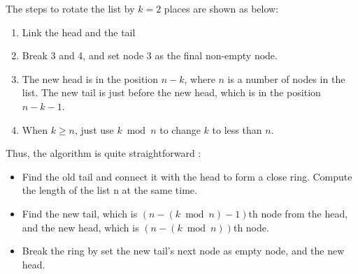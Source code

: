 The steps to rotate the list by $k=2$ places are shown as below:

\begin{enumerate}
\item Link the head and the tail
\begin{figure}[H]
\end{figure}
\item Break 3 and 4, and set node 3 as the final non-empty node.
\begin{figure}[H]
\end{figure}
\item The new head is in the position $n-k$, where $n$ is a number of nodes in the list. The new tail is just before the new head, which is in the position $n - k - 1$.
\item When $k\geq n$, just use $k\bmod n$ to change $k$ to less than $n$.
\end{enumerate}

Thus, the algorithm is quite straightforward :

\begin{itemize}
\item Find the old tail and connect it with the head to form a close ring. Compute the length of the list n at the same time.

\item Find the new tail, which is $(n - (k\bmod n) - 1)$th node from the head, and the new head, which is $(n - (k\bmod n))$th node.

\item Break the ring by set the new tail's next node as empty node, and the new head.
\end{itemize}

